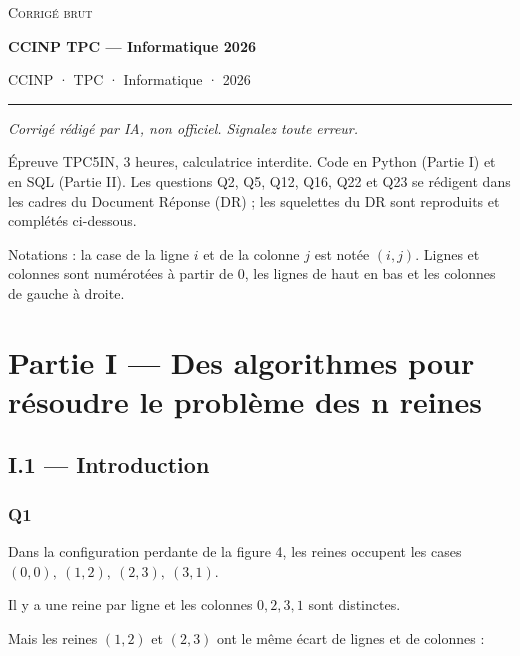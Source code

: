 \documentclass[11pt,a4paper]{article}
\newcommand{\equationajustee}[1]{%
  \sbox{\boiteequation}{$\displaystyle #1$}%
  \ifdim\wd\boiteequation>\linewidth
    \[\resizebox{\linewidth}{!}{\usebox{\boiteequation}}\]%
  \else
    \[#1\]%
  \fi}
\begin{document}
\thispagestyle{plain}
\begin{center}
  {\small\scshape Corrigé brut}\par\smallskip
  {\LARGE\bfseries CCINP TPC — Informatique 2026\par}\medskip
  {\large CCINP · TPC · Informatique · 2026\par}
\end{center}
\vspace{2pt}\hrule\vspace{8pt}

\emph{Corrigé rédigé par IA, non officiel. Signalez toute erreur.}

Épreuve TPC5IN, 3 heures, calculatrice interdite. Code en Python (Partie I) et en SQL (Partie II). Les questions Q2, Q5, Q12, Q16, Q22 et Q23 se rédigent dans les cadres du Document Réponse (DR) ; les squelettes du DR sont reproduits et complétés ci-dessous.

Notations : la case de la ligne \(i\) et de la colonne \(j\) est notée \((i, j)\). Lignes et colonnes sont numérotées à partir de \(0\), les lignes de haut en bas et les colonnes de gauche à droite.

\hypertarget{partie-i-des-algorithmes-pour-ruxe9soudre-le-probluxe8me-des-n-reines}{%
\section{Partie I --- Des algorithmes pour résoudre le problème des n reines}\label{partie-i-des-algorithmes-pour-ruxe9soudre-le-probluxe8me-des-n-reines}}

\hypertarget{i.1-introduction}{%
\subsection{I.1 --- Introduction}\label{i.1-introduction}}

\hypertarget{q1}{%
\subsubsection{Q1}\label{q1}}

Dans la configuration perdante de la figure 4, les reines occupent les cases \((0,0),\ (1,2),\ (2,3),\ (3,1)\).

Il y a une reine par ligne et les colonnes \(0, 2, 3, 1\) sont distinctes.

Mais les reines \((1,2)\) et \((2,3)\) ont le même écart de lignes et de colonnes :

\equationajustee{\begin{aligned}
2 - 1 &= 1 \quad \text{(lignes)} \\
3 - 2 &= 1 \quad \text{(colonnes)}
\end{aligned}}
\end{document}
